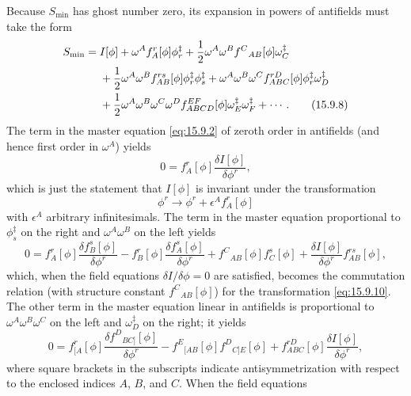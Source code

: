 Because $S_{\min}$ has ghost number zero, its expansion in powers of antifields
must take the form
\begin{align}
S_{\min}={}&I[\phi]+\omega^A f_A^r[\phi]\phi_r^{\ddagger}
+\frac12\omega^A\omega^B f^C{}_{AB}[\phi]\omega_C^{\ddagger}
\notag\\
&+\frac12\omega^A\omega^B f^{rs}_{AB}[\phi]
  \phi_r^{\ddagger}\phi_s^{\ddagger}
+\omega^A\omega^B\omega^C f^{rD}_{ABC}[\phi]
  \phi_r^{\ddagger}\omega_D^{\ddagger}
\notag\\
&+\frac12\omega^A\omega^B\omega^C\omega^D f^{EF}_{ABCD}[\phi]
  \omega_E^{\ddagger}\omega_F^{\ddagger}+\cdots.
\tag{15.9.8}\label{eq:15.9.8}
\end{align}
The term in the master equation \eqref{eq:15.9.2} of zeroth order in
antifields (and hence first order in $\omega^A$) yields
\begin{equation}
0=f_A^r[\phi]\frac{\delta I[\phi]}{\delta\phi^r},
\tag{15.9.9}\label{eq:15.9.9}
\end{equation}
which is just the statement that $I[\phi]$ is invariant under the
transformation
\begin{equation}
\phi^r\longrightarrow\phi^r+\epsilon^A f_A^r[\phi]
\tag{15.9.10}\label{eq:15.9.10}
\end{equation}
with $\epsilon^A$ arbitrary infinitesimals. The term in the master equation
proportional to $\phi_s^{\ddagger}$ on the right and $\omega^A\omega^B$ on the
left yields
\begin{equation}
0=f_A^r[\phi]\frac{\delta f_B^s[\phi]}{\delta\phi^r}
-f_B^r[\phi]\frac{\delta f_A^s[\phi]}{\delta\phi^r}
+f^C{}_{AB}[\phi]f_C^s[\phi]
+\frac{\delta I[\phi]}{\delta\phi^r}f^{rs}_{AB}[\phi],
\tag{15.9.11}\label{eq:15.9.11}
\end{equation}
which, when the field equations $\delta I/\delta\phi=0$ are satisfied, becomes
the commutation relation (with structure constant $f^C{}_{AB}[\phi]$) for the
transformation \eqref{eq:15.9.10}. The other term in the master equation
linear in antifields is proportional to $\omega^A\omega^B\omega^C$ on the
left and $\omega_D^{\ddagger}$ on the right; it yields
\begin{equation}
0=f^r_{[A}[\phi]\frac{\delta f^D{}_{BC]}[\phi]}{\delta\phi^r}
-f^E{}_{[AB}[\phi]f^D{}_{C]E}[\phi]
+f^{rD}_{ABC}[\phi]\frac{\delta I[\phi]}{\delta\phi^r},
\tag{15.9.12}\label{eq:15.9.12}
\end{equation}
where square brackets in the subscripts indicate antisymmetrization with
respect to the enclosed indices $A$, $B$, and $C$. When the field equations
